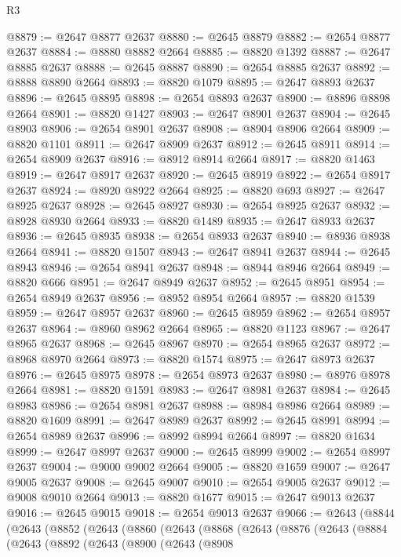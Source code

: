 \begin{lexlean}{R3}
\begin{coremodule}
@8879 := @2647 @8877 @2637
@8880 := @2645 @8879
@8882 := @2654 @8877 @2637
@8884 := @8880 @8882 @2664
@8885 := @8820 @1392
@8887 := @2647 @8885 @2637
@8888 := @2645 @8887
@8890 := @2654 @8885 @2637
@8892 := @8888 @8890 @2664
@8893 := @8820 @1079
@8895 := @2647 @8893 @2637
@8896 := @2645 @8895
@8898 := @2654 @8893 @2637
@8900 := @8896 @8898 @2664
@8901 := @8820 @1427
@8903 := @2647 @8901 @2637
@8904 := @2645 @8903
@8906 := @2654 @8901 @2637
@8908 := @8904 @8906 @2664
@8909 := @8820 @1101
@8911 := @2647 @8909 @2637
@8912 := @2645 @8911
@8914 := @2654 @8909 @2637
@8916 := @8912 @8914 @2664
@8917 := @8820 @1463
@8919 := @2647 @8917 @2637
@8920 := @2645 @8919
@8922 := @2654 @8917 @2637
@8924 := @8920 @8922 @2664
@8925 := @8820 @693
@8927 := @2647 @8925 @2637
@8928 := @2645 @8927
@8930 := @2654 @8925 @2637
@8932 := @8928 @8930 @2664
@8933 := @8820 @1489
@8935 := @2647 @8933 @2637
@8936 := @2645 @8935
@8938 := @2654 @8933 @2637
@8940 := @8936 @8938 @2664
@8941 := @8820 @1507
@8943 := @2647 @8941 @2637
@8944 := @2645 @8943
@8946 := @2654 @8941 @2637
@8948 := @8944 @8946 @2664
@8949 := @8820 @666
@8951 := @2647 @8949 @2637
@8952 := @2645 @8951
@8954 := @2654 @8949 @2637
@8956 := @8952 @8954 @2664
@8957 := @8820 @1539
@8959 := @2647 @8957 @2637
@8960 := @2645 @8959
@8962 := @2654 @8957 @2637
@8964 := @8960 @8962 @2664
@8965 := @8820 @1123
@8967 := @2647 @8965 @2637
@8968 := @2645 @8967
@8970 := @2654 @8965 @2637
@8972 := @8968 @8970 @2664
@8973 := @8820 @1574
@8975 := @2647 @8973 @2637
@8976 := @2645 @8975
@8978 := @2654 @8973 @2637
@8980 := @8976 @8978 @2664
@8981 := @8820 @1591
@8983 := @2647 @8981 @2637
@8984 := @2645 @8983
@8986 := @2654 @8981 @2637
@8988 := @8984 @8986 @2664
@8989 := @8820 @1609
@8991 := @2647 @8989 @2637
@8992 := @2645 @8991
@8994 := @2654 @8989 @2637
@8996 := @8992 @8994 @2664
@8997 := @8820 @1634
@8999 := @2647 @8997 @2637
@9000 := @2645 @8999
@9002 := @2654 @8997 @2637
@9004 := @9000 @9002 @2664
@9005 := @8820 @1659
@9007 := @2647 @9005 @2637
@9008 := @2645 @9007
@9010 := @2654 @9005 @2637
@9012 := @9008 @9010 @2664
@9013 := @8820 @1677
@9015 := @2647 @9013 @2637
@9016 := @2645 @9015
@9018 := @2654 @9013 @2637
@9066 := @2643
    (@8844
      (@2643
        (@8852
          (@2643
            (@8860
              (@2643
                (@8868
                  (@2643
                    (@8876
                      (@2643
                        (@8884
                          (@2643
                            (@8892
                              (@2643
                                (@8900
                                  (@2643
                                    (@8908

\end{coremodule}
\end{lexlean}
